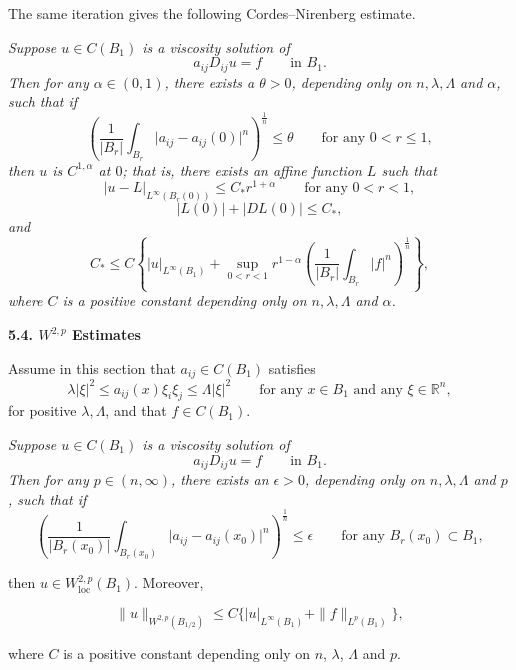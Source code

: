 The same iteration gives the following Cordes--Nirenberg estimate.

\begin{theorem}\label{hanlin:ch05-thm-5-21} \emph{Suppose $u \in C(B_1)$ is a viscosity solution of}
\[
a_{ij}D_{ij}u = f \qquad \text{in } B_1.
\]
\emph{Then for any $\alpha \in (0,1)$, there exists a $\theta > 0$, depending only on $n,\lambda,\Lambda$ and $\alpha$, such that if}
\[
\left(\frac{1}{\lvert B_r\rvert}\int_{B_r}\lvert a_{ij} - a_{ij}(0)\rvert^n\right)^{\frac{1}{n}} \le \theta \qquad \text{for any } 0 < r \le 1,
\]
\emph{then $u$ is $C^{1,\alpha}$ at $0$; that is, there exists an affine function $L$ such that}
\[
\lvert u - L\rvert_{L^\infty(B_r(0))} \le C_*r^{1+\alpha} \qquad \text{for any } 0 < r < 1,
\]
\[
\lvert L(0)\rvert + \lvert DL(0)\rvert \le C_*,
\]
\emph{and}
\[
C_* \le C\left\{\lvert u\rvert_{L^\infty(B_1)} + \sup_{0<r<1} r^{1-\alpha}\left(\frac{1}{\lvert B_r\rvert}\int_{B_r}\lvert f\rvert^n\right)^{\frac{1}{n}}\right\},
\]
\emph{where $C$ is a positive constant depending only on $n,\lambda,\Lambda$ and $\alpha$.}
\end{theorem}

\textbf{5.4. $W^{2,p}$ Estimates}

Assume in this section that $a_{ij}\in C(B_1)$ satisfies
\[
\lambda\lvert\xi\rvert^2 \le a_{ij}(x)\xi_i\xi_j \le \Lambda\lvert\xi\rvert^2 \qquad \text{for any } x \in B_1 \text{ and any } \xi \in \mathbb{R}^n,
\]
for positive $\lambda,\Lambda$, and that $f\in C(B_1)$.

\begin{theorem}\label{hanlin:ch05-thm-5-22} \emph{Suppose $u \in C(B_1)$ is a viscosity solution of}
\[
a_{ij}D_{ij}u = f \qquad \text{in } B_1.
\]
\emph{Then for any $p \in (n,\infty)$, there exists an $\epsilon > 0$, depending only on $n,\lambda,\Lambda$ and $p$, such that if}
\[
\left(\frac{1}{\lvert B_r(x_0)\rvert}\int_{B_r(x_0)}\lvert a_{ij} - a_{ij}(x_0)\rvert^n\right)^{\frac{1}{n}} \le \epsilon \qquad \text{for any } B_r(x_0) \subset B_1,
\]

then $u \in W^{2,p}_{\mathrm{loc}}(B_1)$. Moreover,

\[
\|u\|_{W^{2,p}(B_{1/2})} \leq C\{|u|_{L^\infty(B_1)} + \|f\|_{L^p(B_1)}\},
\]

where $C$ is a positive constant depending only on $n$, $\lambda$, $\Lambda$ and $p$.
\end{theorem}

